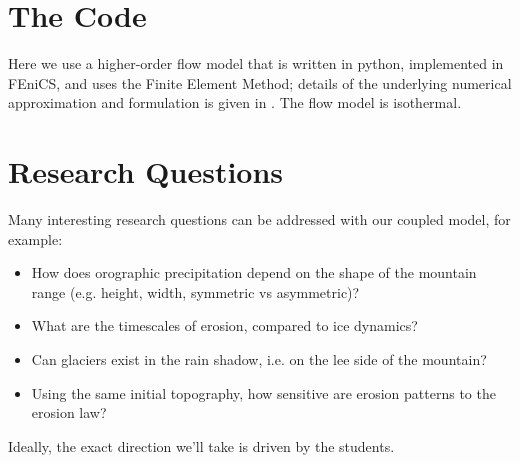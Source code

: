 \documentclass[11pt]{article}
\begin{document}
\section{The Code}

Here we use a higher-order flow model that is written in python, implemented in FEniCS, and uses the Finite Element Method; details of the underlying numerical approximation and formulation is given in  \cite{Brinkerhoff2015a}. The flow model is isothermal.

\section{Research Questions}

Many interesting research questions can be addressed with our coupled model, for example:
\begin{itemize}
\item How does orographic precipitation depend on the shape of the mountain range (e.g. height, width, symmetric vs asymmetric)?
\item What are the timescales of erosion, compared to ice dynamics?
\item Can glaciers exist in the rain shadow, i.e. on the lee side of the mountain?
\item Using the same initial topography, how sensitive are erosion patterns to the erosion law?
\end{itemize}
Ideally, the exact direction we'll take is driven by the students.
\end{document}
